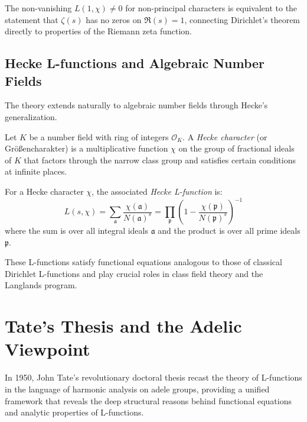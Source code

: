 \begin{remark}
The non-vanishing $L(1,\chi) \neq 0$ for non-principal characters is equivalent to the statement that $\zeta(s)$ has no zeros on $\Re(s) = 1$, connecting Dirichlet's theorem directly to properties of the Riemann zeta function.
\end{remark}

\subsection{Hecke L-functions and Algebraic Number Fields}

The theory extends naturally to algebraic number fields through Hecke's generalization.

\begin{definition}
Let $K$ be a number field with ring of integers $\mathcal{O}_K$. A \emph{Hecke character} (or Größencharakter) is a multiplicative function $\chi$ on the group of fractional ideals of $K$ that factors through the narrow class group and satisfies certain conditions at infinite places.
\end{definition}

\begin{definition}
For a Hecke character $\chi$, the associated \emph{Hecke L-function} is:
\begin{equation}
L(s,\chi) = \sum_{\mathfrak{a}} \frac{\chi(\mathfrak{a})}{N(\mathfrak{a})^s} = \prod_{\mathfrak{p}} \left(1 - \frac{\chi(\mathfrak{p})}{N(\mathfrak{p})^s}\right)^{-1}
\end{equation}
where the sum is over all integral ideals $\mathfrak{a}$ and the product is over all prime ideals $\mathfrak{p}$.
\end{definition}

These L-functions satisfy functional equations analogous to those of classical Dirichlet L-functions and play crucial roles in class field theory and the Langlands program.

\section{Tate's Thesis and the Adelic Viewpoint}
\label{sec:tate-thesis}

In 1950, John Tate's revolutionary doctoral thesis \cite{tate1950,cassels1967} recast the theory of L-functions in the language of harmonic analysis on adele groups, providing a unified framework that reveals the deep structural reasons behind functional equations and analytic properties of L-functions.

